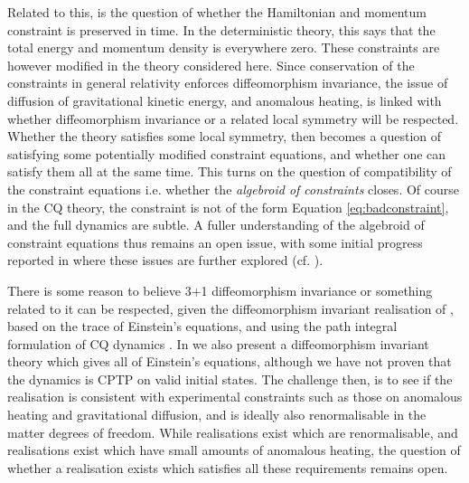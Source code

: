 \documentclass[aps,pra,showpacs,citeautoscript,amsmath,amssymb,floatfix,superscriptaddress,bbm, verbatim,amsfonts,changes,11pt,nofootinbib,longbibliography]{revtex4-2}
\begin{document}
Related to this, is the question of whether 
  the Hamiltonian and momentum constraint is preserved in time. In the deterministic theory, this says that the total energy and momentum density is everywhere zero. These constraints are however modified in the theory considered here. Since conservation of the constraints in general relativity enforces diffeomorphism invariance, the issue of diffusion of gravitational kinetic energy, and anomalous heating, is linked with whether diffeomorphism invariance or a related local symmetry will be respected.  Whether the theory satisfies some local symmetry, then becomes a question of satisfying some potentially modified constraint equations, and whether one can satisfy them all at the same time. %
  This turns on the question of compatibility of the constraint equations i.e. whether the {\it algebroid of constraints} \cite{algebroid_foot} closes. %
  Of course in the CQ theory, the constraint is not of the form Equation \eqref{eq:badconstraint}, and the full dynamics are subtle. A fuller understanding of the algebroid of constraint equations thus remains an open issue, with some initial progress reported in  \cite{UCL2022constraints} where these issues are further explored (cf.  \cite{oppenheim2023covariant}).
  
There is some reason to believe 3+1 diffeomorphism invariance or something related to it can be respected, given the diffeomorphism invariant realisation of  \cite{oppenheim2023covariant}, based on the trace of Einstein's equations, and using the path integral formulation of CQ dynamics \cite{oppenheim2023path}. In   \cite{oppenheim2023covariant} we also present a diffeomorphism invariant theory which gives all of Einstein's equations, although we have not proven that the dynamics is CPTP on valid initial states. The  challenge then, is to see if the realisation is consistent with experimental constraints such as those on anomalous heating and gravitational diffusion, and is ideally also renormalisable in the matter degrees of freedom. While realisations exist which are renormalisable, and realisations exist which have small amounts of anomalous heating, the question of whether a realisation exists which satisfies all these requirements remains open.\label{par:challenge}
\end{document}
